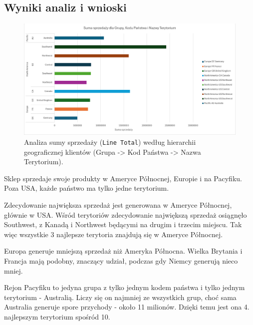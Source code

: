 \documentclass[a4paper,12pt]{article}
\begin{document}
\subsection{Wyniki analiz i wnioski}

\begin{figure}[H]
    \centering
    \includegraphics[width=1.0\textwidth]{images/7_1.png}
    \caption{Analiza sumy sprzedaży (\texttt{Line Total}) według hierarchii geograficznej klientów (Grupa -> Kod Państwa -> Nazwa Terytorium).}
\end{figure}

Sklep sprzedaje swoje produkty w Ameryce Północnej, Europie i na Pacyfiku. Poza USA, każde państwo ma tylko jedne terytorium.

Zdecydowanie największa sprzedaż jest generowana w Ameryce Północnej, głównie w USA. Wśród terytoriów zdecydowanie największą sprzedaż osiągnęło Southwest, z Kanadą i Northwest będącymi na drugim i trzecim miejscu. Tak więc wszystkie 3 najlepsze terytoria znajdują się w Ameryce Północnej.

Europa generuje mniejszą sprzedaż niż Ameryka Północna. Wielka Brytania i Francja mają podobny, znaczący udział, podczas gdy Niemcy generują nieco mniej.

Rejon Pacyfiku to jedyna grupa z tylko jednym kodem państwa i tylko jednym terytorium - Australią. Liczy się on najmniej ze wszystkich grup, choć sama Australia generuje spore przychody - około 11 milionów. Dzięki temu jest ona 4. najlepszym terytorium spośród 10.
\end{document}

